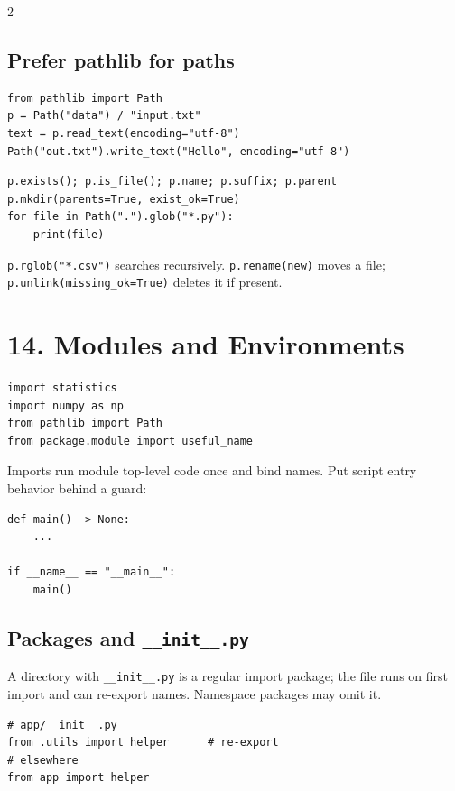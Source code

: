 \documentclass[10pt,a4paper]{article}
\newcommand{\py}[1]{\texttt{#1}}
\begin{document}
\begin{multicols}{2}
\subsection{Prefer pathlib for paths}

\begin{lstlisting}
from pathlib import Path
p = Path("data") / "input.txt"
text = p.read_text(encoding="utf-8")
Path("out.txt").write_text("Hello", encoding="utf-8")
\end{lstlisting}

\begin{lstlisting}
p.exists(); p.is_file(); p.name; p.suffix; p.parent
p.mkdir(parents=True, exist_ok=True)
for file in Path(".").glob("*.py"):
    print(file)
\end{lstlisting}

\py{p.rglob("*.csv")} searches recursively. \py{p.rename(new)} moves a file; \py{p.unlink(missing\_ok=True)} deletes it if present.

\section{14. Modules and Environments}

\begin{lstlisting}
import statistics
import numpy as np
from pathlib import Path
from package.module import useful_name
\end{lstlisting}

Imports run module top-level code once and bind names. Put script entry behavior behind a guard:

\begin{lstlisting}
def main() -> None:
    ...

if __name__ == "__main__":
    main()
\end{lstlisting}

\subsection{Packages and \texttt{\_\_init\_\_.py}}

A directory with \py{\_\_init\_\_.py} is a regular import package; the file runs on first import and can re-export names. Namespace packages may omit it.

\begin{lstlisting}
# app/__init__.py
from .utils import helper      # re-export
# elsewhere
from app import helper
\end{lstlisting}


\end{multicols}
\end{document}
